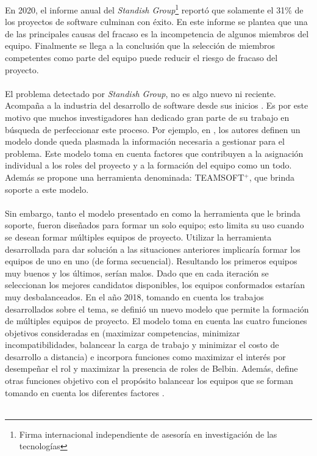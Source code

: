 En 2020, el informe anual del \textit{Standish Group}\footnote{Firma internacional independiente de asesoría en investigación de las tecnologías}\cite{Group2020} reportó que solamente el 31\% de los proyectos de software culminan con éxito. En este informe se plantea que una de las principales causas del fracaso es la incompetencia de algunos miembros del equipo. Finalmente se llega a la conclusión que la selección de miembros competentes como parte del equipo puede reducir el riesgo de fracaso del proyecto.\\ \\

El problema detectado por \textit{Standish Group}, no es algo nuevo ni reciente. Acompaña a la industria del desarrollo de software desde sus inicios \cite{ElEmam2008}. Es por este motivo que muchos investigadores han dedicado gran parte de su trabajo en búsqueda de perfeccionar este proceso. Por ejemplo, en \cite{Mayi09}, los autores definen un modelo donde queda plasmada la información necesaria a gestionar para el problema. Este modelo toma en cuenta factores que contribuyen a la asignación individual a los roles del proyecto y a la formación del equipo como un todo. Además se propone una herramienta denominada: TEAMSOFT$^+$, que brinda soporte a este modelo.\\\\

Sin embargo, tanto el modelo presentado en \cite{Mayi09} como la herramienta que le brinda soporte, fueron diseñados para formar un solo equipo; esto limita su uso cuando se desean formar múltiples equipos de proyecto. Utilizar la herramienta desarrollada para dar solución a las situaciones anteriores implicaría formar los equipos de uno en uno (de forma secuencial). Resultando los primeros equipos muy buenos y los últimos, serían malos. Dado que en cada iteración se seleccionan los mejores candidatos disponibles, los equipos conformados estarían muy  desbalanceados. En el año 2018, tomando en cuenta los trabajos desarrollados sobre el tema, se definió un nuevo modelo que permite la formación de múltiples equipos de proyecto. El modelo toma en cuenta las cuatro funciones objetivos consideradas en \cite{Mayi09} (maximizar competencias, minimizar incompatibilidades, balancear la carga de trabajo y minimizar el costo de desarrollo a distancia) e incorpora funciones como maximizar el interés por desempeñar el rol y maximizar la presencia de roles de Belbin. Además, define otras funciones objetivo con el propósito balancear los equipos que se forman tomando en cuenta los diferentes factores \cite{Duran2019}.\\\\


